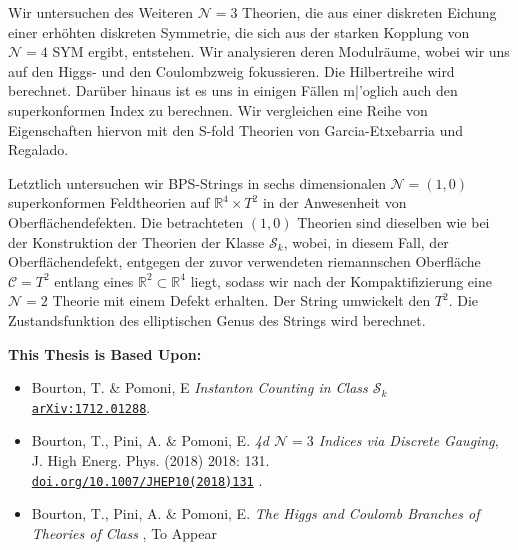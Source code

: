{Wir untersuchen des Weiteren $\mathcal{N}=3$ Theorien, die aus einer diskreten Eichung einer erh\"ohten diskreten Symmetrie, die sich aus der starken Kopplung von $\mathcal{N}=4$ SYM ergibt, entstehen. Wir analysieren deren Modulr\"aume, wobei wir uns auf den Higgs- und den Coulombzweig fokussieren. Die Hilbertreihe wird berechnet. Dar\"uber hinaus ist es uns in einigen F\"allen m|'oglich auch den superkonformen Index zu berechnen. Wir vergleichen eine Reihe von Eigenschaften hiervon mit den S-fold Theorien von Garcia-Etxebarria und Regalado.

\onehalfspacing
Letztlich untersuchen wir BPS-Strings in sechs dimensionalen $\mathcal{N}=(1,0)$ superkonformen Feldtheorien auf $\mathbb{R}^4\times T^2$ in der Anwesenheit von Oberfl\"achendefekten. Die betrachteten $(1,0)$ Theorien sind dieselben wie bei der Konstruktion der Theorien der Klasse $\mathcal{S}_k$, wobei, in diesem Fall, der Oberfl\"achendefekt, entgegen der zuvor verwendeten riemannschen Oberfl\"ache $\mathcal{C}=T^2$ entlang eines $\mathbb{R}^2\subset \mathbb{R}^4$ liegt, sodass wir nach der Kompaktifizierung eine $\mathcal{N}=2$ Theorie mit einem Defekt erhalten. Der String umwickelt den $T^2$. Die Zustandsfunktion des elliptischen Genus des Strings wird berechnet.}
\singlespacing

\thispagestyle{empty}
\cleardoublepage
{}


\newpage
\noindent \textbf{\Large This Thesis is Based Upon:} 

\vspace{1.0cm}
 
\begin{itemize}
	
\item{Bourton, T. \& Pomoni, E {\it {Instanton Counting in Class $\mathcal{S}_k$}}\\  \href{http://arxiv.org/abs/1712.01288}{{\tt arXiv:1712.01288}}.}
    
    \item{Bourton, T., Pini, A. \& Pomoni, E. \textit{4d $\mathcal{N}=3$ Indices via Discrete Gauging}, J. High Energ. Phys. (2018) 2018: 131.\\ \href{https://doi.org/10.1007/JHEP10(2018)131}{{\tt doi.org/10.1007/JHEP10(2018)131}} .}	\\
   
     \item{Bourton, T., Pini, A. \& Pomoni, E. \textit{The Higgs and Coulomb Branches of Theories of Class \Sk}, To Appear}\\

\end{itemize}

